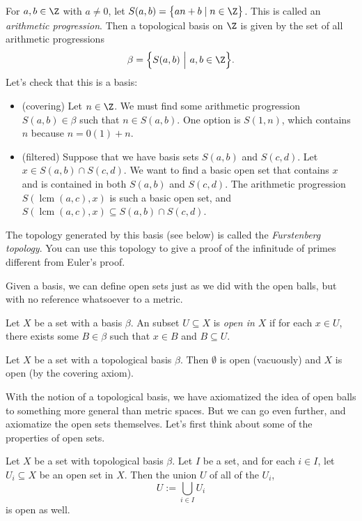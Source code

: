 \documentclass[noname]{notes}
\DeclareMathOperator{\lcm}{lcm}
\begin{document}
\begin{example}
\label{furstenberg}
	For $a, b \in \Z$ with $a \neq 0$, let $S(a,b) = \big\{an + b \mid n \in \Z\big\}$. This is called an \emph{arithmetic progression}. Then a topological basis on $\Z$ is given by the set of all arithmetic progressions 
	\[
		\beta = \Big\{ S(a,b) \ \Big\vert\ a,b \in \Z\Big\}. 
	\]
	Let's check that this is a basis: 
	
	\begin{itemize}
		\item (covering) Let $n \in \Z$. We must find some arithmetic progression $S(a,b) \in \beta$ such that $n \in S(a,b)$. One option is $S(1,n)$, which contains $n$ because $n = 0(1) + n$. 
		\item (filtered) Suppose that we have basis sets $S(a,b)$ and $S(c,d)$. Let $x \in S(a,b) \cap S(c,d)$. We want to find a basic open set that contains $x$ and is contained in both $S(a,b)$ and $S(c,d)$. The arithmetic progression $S(\lcm(a,c),x)$ is such a basic open set, and $S(\lcm(a,c),x) \subseteq S(a,b) \cap S(c,d)$. 
	\end{itemize}
\noindent The topology generated by this basis (see below) is called the \emph{Furstenberg topology}. You can use this topology to give a proof of the infinitude of primes different from Euler's proof.  
\end{example}

Given a basis, we can define open sets just as we did with the open balls, but with no reference whatsoever to a metric. 

\begin{definition}
	Let $X$ be a set with a basis $\beta$. An subset $U \subseteq X$ is \emph{open in $X$} if for each $x \in U$, there exists some $B \in \beta$ such that $x \in B$ and  $B \subseteq U$. 
\end{definition}

\begin{example}
	\label{empty and everything are open}
	Let $X$ be a set with a topological basis $\beta$. Then $\emptyset$ is open (vacuously) and $X$ is open (by the covering axiom). 
\end{example}

With the notion of a topological basis, we have axiomatized the idea of open balls to something more general than metric spaces. But we can go even further, and axiomatize the open sets themselves. Let's first think about some of the properties of open sets. 

\begin{lemma}
	\label{arbitrary unions of basis opens}
	Let $X$ be a set with topological basis $\beta$. Let $I$ be a set, and for each $i \in I$, let $U_i \subseteq X$ be an open set in $X$. Then the union $U$ of all of the $U_i$, 
	\[
		U := \bigcup_{i \in I} U_i 
	\]
	is open as well. 
\end{lemma}
\end{document}
